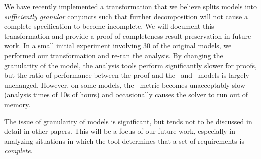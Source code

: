 %
We have recently implemented a transformation that we believe splits models into {\em sufficiently granular} conjuncts such that further decomposition will not cause a complete specification to become incomplete.  We will document this transformation and provide a proof of completeness-result-preservation in future work.
%
In a small initial experiment involving 30 of the original models, we performed our transformation and re-ran the analysis.  By changing the granularity of the model, the analysis tools perform significantly slower for proofs, but the ratio of performance between the proof and the \ucalg\ and \nondetcovalt\ models is largely unchanged.  However, on some models, the \nondetcovalt\ metric becomes unacceptably slow (analysis times of 10s of hours) and occasionally causes the solver to run out of memory.

The issue of granularity of models is significant, but tends not to be discussed in detail in other papers.  This will be a focus of our future work, especially in analyzing situations in which the tool determines that a set of requirements is {\em complete}.

